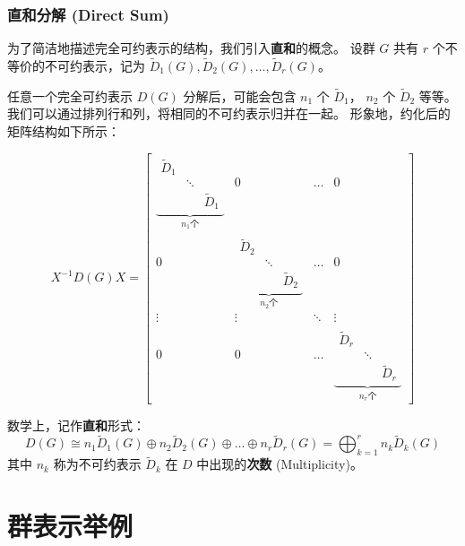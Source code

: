 \subsubsection{直和分解 (Direct Sum)}
为了简洁地描述完全可约表示的结构，我们引入\textbf{直和}的概念。
设群 $G$ 共有 $r$ 个不等价的不可约表示，记为 $\tilde{D}_1(G), \tilde{D}_2(G), \dots, \tilde{D}_r(G)$。

任意一个完全可约表示 $D(G)$ 分解后，可能会包含 $n_1$ 个 $\tilde{D}_1$， $n_2$ 个 $\tilde{D}_2$ 等等。我们可以通过排列行和列，将相同的不可约表示归并在一起。
形象地，约化后的矩阵结构如下所示：

\begin{equation}
    X^{-1}D(G)X = \left[
    \begin{array}{c|c|c|c}
        \underbrace{\begin{matrix} \tilde{D}_1 & & \\ & \ddots & \\ & & \tilde{D}_1 \end{matrix}}_{n_1 \text{个}} & 0 & \dots & 0 \\
        \hline
        0 & \underbrace{\begin{matrix} \tilde{D}_2 & & \\ & \ddots & \\ & & \tilde{D}_2 \end{matrix}}_{n_2 \text{个}} & \dots & 0 \\
        \hline
        \vdots & \vdots & \ddots & \vdots \\
        \hline
        0 & 0 & \dots & \underbrace{\begin{matrix} \tilde{D}_r & & \\ & \ddots & \\ & & \tilde{D}_r \end{matrix}}_{n_r \text{个}}
    \end{array}
    \right]
\end{equation}

数学上，记作\textbf{直和}形式：
\begin{equation}
    D(G) \cong n_1 \tilde{D}_1(G) \oplus n_2 \tilde{D}_2(G) \oplus \dots \oplus n_r \tilde{D}_r(G) = \bigoplus_{k=1}^r n_k \tilde{D}_k(G)
\end{equation}
其中 $n_k$ 称为不可约表示 $\tilde{D}_k$ 在 $D$ 中出现的\textbf{次数} (Multiplicity)。

\section{群表示举例}

